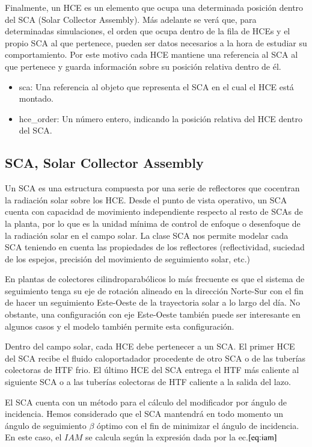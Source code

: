 Finalmente, un HCE es un elemento que ocupa una determinada posición dentro del SCA (Solar Collector Assembly). Más adelante se verá que, para determinadas simulaciones, el orden que ocupa dentro de la fila de HCEs y el propio SCA al que pertenece, pueden ser datos necesarios a la hora de estudiar su comportamiento. Por este motivo cada HCE mantiene una referencia al SCA al que pertenece y guarda información sobre su posición relativa dentro de él. 
\begin{itemize}
\item
  sca: Una referencia al objeto que representa el SCA en el cual el HCE
  está montado.
\item
  hce\_order: Un número entero, indicando la posición relativa del HCE
  dentro del SCA.
\end{itemize}

\subsection{SCA, Solar Collector Assembly}
\label{solar-collector-assembly-sca}

Un SCA es una estructura compuesta por una serie de reflectores que cocentran la radiación solar sobre los HCE. Desde el punto de vista operativo, un SCA cuenta con capacidad de movimiento independiente respecto al resto de SCAs de la planta, por lo que es la unidad mínima de control de enfoque o desenfoque de la radiación solar en el campo solar. La clase SCA nos permite modelar cada SCA teniendo en cuenta las propiedades de los reflectores (reflectividad, suciedad de los espejos, precisión del movimiento de seguimiento solar, etc.)

En plantas de colectores cilindroparabólicos lo más frecuente es que el sistema de seguimiento tenga su eje de rotación alineado en la dirección Norte-Sur con el fin de hacer un seguimiento Este-Oeste de la trayectoria solar a lo largo del día. No obstante, una configuración con eje Este-Oeste también puede ser interesante en algunos casos y el modelo también permite esta configuración.

Dentro del campo solar, cada HCE debe pertenecer a un SCA. El primer HCE del SCA recibe el fluido caloportadador procedente de otro SCA o de las tuberías colectoras de HTF frio. El último HCE del SCA entrega el HTF más caliente al siguiente SCA o a las tuberías colectoras de HTF caliente a la salida del lazo.

El SCA cuenta con un método para el cálculo del modificador por ángulo de incidencia. Hemos considerado que el SCA mantendrá en todo momento un ángulo de seguimiento \(\beta\) óptimo con el fin de minimizar el ángulo de incidencia. En este caso, el \(IAM\) se calcula según la expresión dada por la ec.\(\eqref{eq:iam}\)

